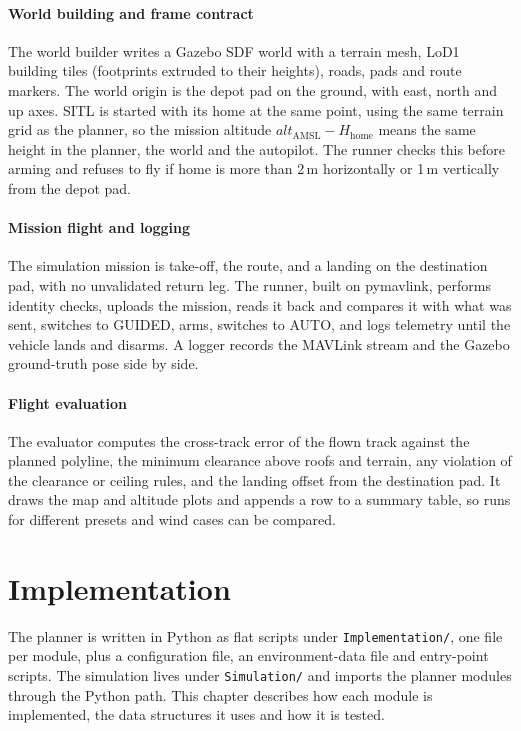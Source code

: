 \documentclass{ssnreview}
\newcommand{\flowchapter}[1]{\par\addvspace{30pt}\let\origclearpage\clearpage\let\clearpage\relax\chapter{#1}\let\clearpage\origclearpage}  %
\begin{document}
\subsubsection{World building and frame contract}

The world builder writes a Gazebo SDF world with a terrain mesh, LoD1 building tiles
(footprints extruded to their heights), roads, pads and route markers. The world origin
is the depot pad on the ground, with east, north and up axes. SITL is started with its
home at the same point, using the same terrain grid as the planner, so the mission
altitude $\mathit{alt}_\mathrm{AMSL} - H_\mathrm{home}$ means the same height in the
planner, the world and the autopilot. The runner checks this before arming and refuses to
fly if home is more than 2\,m horizontally or 1\,m vertically from the depot pad.

\subsubsection{Mission flight and logging}

The simulation mission is take-off, the route, and a landing on the destination pad, with
no unvalidated return leg. The runner, built on pymavlink, performs identity checks,
uploads the mission, reads it back and compares it with what was sent, switches to
GUIDED, arms, switches to AUTO, and logs telemetry until the vehicle lands and disarms. A
logger records the MAVLink stream and the Gazebo ground-truth pose side by side.

\subsubsection{Flight evaluation}

The evaluator computes the cross-track error of the flown track against the planned
polyline, the minimum clearance above roofs and terrain, any violation of the clearance or
ceiling rules, and the landing offset from the destination pad. It draws the map and
altitude plots and appends a row to a summary table, so runs for different presets and
wind cases can be compared.


\flowchapter{Implementation}\label{cha:implementation}

The planner is written in Python as flat scripts under \texttt{Implementation/}, one file
per module, plus a configuration file, an environment-data file and entry-point scripts.
The simulation lives under \texttt{Simulation/} and imports the planner modules through
the Python path. This chapter describes how each module is implemented, the data
structures it uses and how it is tested.
\end{document}
